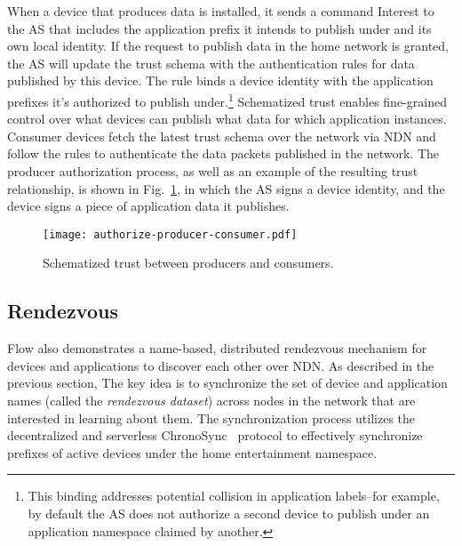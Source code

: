 
When a device that produces data is installed, it sends a command Interest to the AS that includes the application prefix it intends to publish under and its own local identity.
If the request to publish data in the home network is granted, the AS will update the trust schema with the authentication rules for data published by this device. The rule binds a device identity with the application prefixes it's authorized to publish under.\footnote{This binding addresses potential collision in application labels--for example, by default the AS does not authorize a second device to publish under an application namespace claimed by another.}
Schematized trust enables fine-grained control over what devices can publish what data for which application instances. Consumer devices fetch the latest trust schema over the network via NDN and follow the rules to authenticate the data packets published in the network.
The producer authorization process, as well as an example of the resulting trust relationship, is shown in Fig.~\ref{fig:flow-app-authorization-trust-relationship}, in which the AS signs a device identity, and the device signs a piece of application data it publishes.

\begin{figure}[!t]
\centering
\texttt{[image: authorize-producer-consumer.pdf]}
\caption{Schematized trust between producers and consumers.}
\label{fig:flow-app-authorization-trust-relationship}
\end{figure}

\subsection{Rendezvous}
\label{sec:rendezvous}

Flow also demonstrates a name-based, distributed rendezvous mechanism for devices and applications to discover each other over NDN.
As described in the previous section, The key idea is to synchronize the set of device and application names (called the \textit{rendezvous dataset}) across nodes in the network that are interested in learning about them.
The synchronization process utilizes the decentralized and serverless ChronoSync~\cite{chronosync} protocol to effectively synchronize prefixes of active devices under the home entertainment  namespace.

